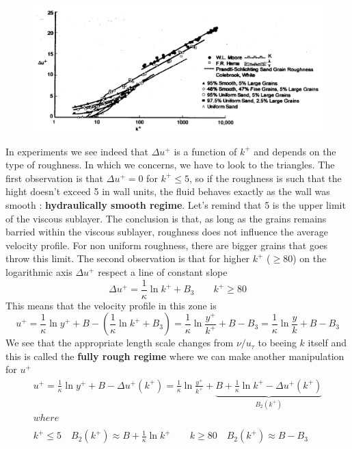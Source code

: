 		\begin{figure}
		\vspace{-5mm}
		\includegraphics[scale=0.27]{ch4/9}
		\label{fig:4.9}
		\end{figure} 
		In experiments we see indeed that $\Delta u^+$ is a function of $k^+$ and depends on the type of roughness. In which we concerns, we have to look to the triangles. The first observation is that $\Delta u^+ = 0$ for $k^+ \leq 5$, so if the roughness is such that the hight doesn't exceed 5 in wall units, the fluid behaves exactly as the wall was smooth : \textbf{hydraulically smooth regime}. Let's remind that 5 is the upper limit of the viscous sublayer. The conclusion is that, as long as the grains remains barried within the viscous sublayer, roughness does not influence the average velocity profile. For non uniform roughness, there are bigger grains that goes throw this limit. 
		The second observation is that for higher $k^+$ ($\geq 80$) on the logarithmic axis $\Delta u^+$ respect a line of constant slope 
		\begin{equation}
			\Delta u^+ =  \frac{1}{\kappa} \ln k^+ + B_3 \qquad k^+ \geq 80 
		\end{equation}
		This means that the velocity profile in this zone is 
		\begin{equation}
			u^+   = \frac{1}{\kappa} \ln y^+ + B - \left(  \frac{1}{\kappa} \ln k^+ + B_3 \right) 
 		= \frac{1}{\kappa} \ln \frac{y^+}{k^+} + B - B_3  = \frac{1}{\kappa} \ln \frac{y}{k} + B - B_3 
		\end{equation}
		We see that the appropriate length scale changes from $\nu / u_\tau$ to beeing $k$ itself and this is called the \textbf{fully rough regime} where we can make another manipulation for $u^+$ 
		\begin{equation}
		\begin{array}{c}
			u^+ = \frac{1}{\kappa}\ln y^+ + B - \Delta u^+ (k^+)  = \frac{1}{\kappa}\ln \frac{y^+}{k^+} + \underbrace{B + \frac{1}{\kappa} \ln k^+ - \Delta u^+ (k^+)}_{B_2(k^+)} \\
			where \\\\
			k^+ \leq 5 \quad B_2(k^+) \approx B+\frac{1}{\kappa}\ln k^+ \qquad k \geq 80 \quad B_2(k^+) \approx B-B_3
		\end{array}
		\end{equation}
		
